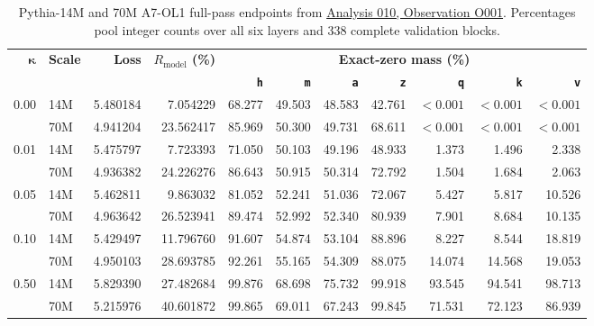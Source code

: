 \documentclass[10pt,a4paper]{article}
\newcommand{\Rmodel}{\ensuremath{R_{\mathrm{model}}}}
\newcommand{\code}[1]{\texttt{#1}}
\begin{document}
{\scriptsize
\begin{table}[htbp]
\centering
\caption{Pythia-14M and 70M A7-OL1 full-pass endpoints from \href{../../../analyses/010-2026-09-01-pythia14m-vs-70m-selected-ladder/observations/O001-pythia14m-vs-70m-selected-ladder.md}{Analysis 010, Observation O001}. Percentages pool integer counts over all six layers and 338 complete validation blocks.}
\label{tab:a7-ol1-scale}
\setlength{\tabcolsep}{1.6pt}
\begin{tabular*}{\textwidth}{@{\extracolsep{\fill}}rl*{9}{r}@{}}
\toprule
$\boldsymbol{\kappa}$ & \textbf{Scale} & \textbf{Loss} & \textbf{\Rmodel{} (\%)} & \multicolumn{7}{c}{\textbf{Exact-zero mass (\%)}} \\
\cmidrule(l){5-11}
& & & & \textbf{\code{h}} & \textbf{\code{m}} & \textbf{\code{a}} & \textbf{\code{z}} & \textbf{\code{q}} & \textbf{\code{k}} & \textbf{\code{v}} \\
\midrule
\multirow{2}{*}{0.00} & 14M & 5.480184 & 7.054229 & 68.277 & 49.503 & 48.583 & 42.761 & $<0.001$ & $<0.001$ & $<0.001$ \\
                       & 70M & 4.941204 & 23.562417 & 85.969 & 50.300 & 49.731 & 68.611 & $<0.001$ & $<0.001$ & $<0.001$ \\
\hline
\multirow{2}{*}{0.01} & 14M & 5.475797 & 7.723393 & 71.050 & 50.103 & 49.196 & 48.933 & 1.373 & 1.496 & 2.338 \\
                       & 70M & 4.936382 & 24.226276 & 86.643 & 50.915 & 50.314 & 72.792 & 1.504 & 1.684 & 2.063 \\
\hline
\multirow{2}{*}{0.05} & 14M & 5.462811 & 9.863032 & 81.052 & 52.241 & 51.036 & 72.067 & 5.427 & 5.817 & 10.526 \\
                       & 70M & 4.963642 & 26.523941 & 89.474 & 52.992 & 52.340 & 80.939 & 7.901 & 8.684 & 10.135 \\
\hline
\multirow{2}{*}{0.10} & 14M & 5.429497 & 11.796760 & 91.607 & 54.874 & 53.104 & 88.896 & 8.227 & 8.544 & 18.819 \\
                       & 70M & 4.950103 & 28.693785 & 92.261 & 55.165 & 54.309 & 88.075 & 14.074 & 14.568 & 19.053 \\
\hline
\multirow{2}{*}{0.50} & 14M & 5.829390 & 27.482684 & 99.876 & 68.698 & 75.732 & 99.918 & 93.545 & 94.541 & 98.713 \\
                       & 70M & 5.215976 & 40.601872 & 99.865 & 69.011 & 67.243 & 99.845 & 71.531 & 72.123 & 86.939 \\
\bottomrule
\end{tabular*}
\end{table}}
\FloatBarrier
\end{document}

